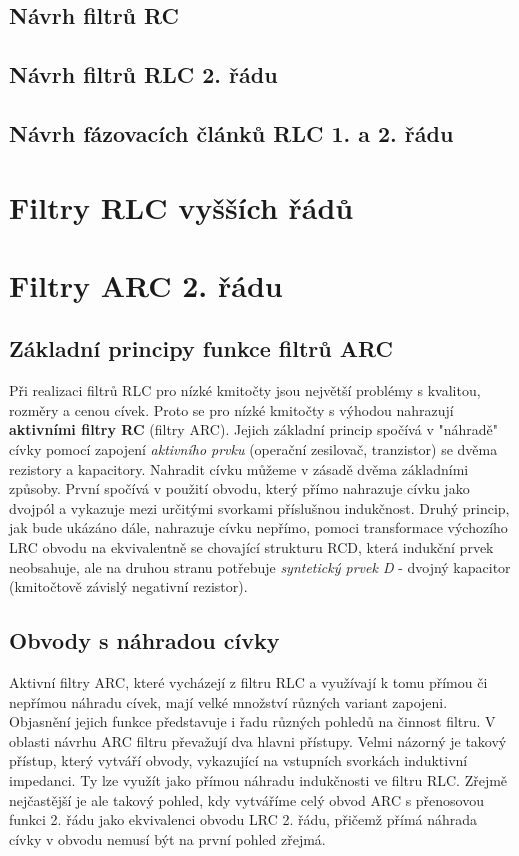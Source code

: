     \subsection{Návrh filtrů RC}
    \subsection{Návrh filtrů RLC 2. řádu}
    \subsection{Návrh fázovacích článků RLC 1. a 2. řádu}     
  \section{Filtry RLC vyšších řádů}
    
  \section{Filtry ARC 2. řádu}
    \subsection{Základní principy funkce filtrů ARC}
      Při realizaci filtrů RLC pro nízké kmitočty jsou největší problémy s kvalitou, rozměry a
      cenou cívek. Proto se pro nízké kmitočty s výhodou nahrazují \textbf{aktivními filtry RC}
      (filtry ARC). Jejich základní princip spočívá v "náhradě" cívky pomocí zapojení
      \emph{aktivního prvku} (operační zesilovač, tranzistor) se dvěma rezistory a kapacitory.
      Nahradit cívku můžeme v zásadě dvěma základními způsoby. První spočívá v použití obvodu,
      který přímo nahrazuje cívku jako dvojpól a vykazuje mezi určitými svorkami příslušnou
      indukčnost. Druhý princip, jak bude ukázáno dále, nahrazuje cívku nepřímo, pomoci
      transformace výchozího LRC obvodu na ekvivalentně se chovající strukturu RCD, která indukční
      prvek neobsahuje, ale na druhou stranu potřebuje \emph{syntetický prvek D} - dvojný kapacitor
      (kmitočtově závislý negativní rezistor).

    \subsection{Obvody s náhradou cívky}
      Aktivní filtry ARC, které vycházejí z filtru RLC a využívají k tomu přímou či nepřímou
      náhradu cívek, mají velké množství různých variant zapojeni. Objasnění jejich funkce
      představuje i řadu různých pohledů na činnost filtru. V oblasti návrhu ARC filtru převažují
      dva hlavni přístupy. Velmi názorný je takový přístup, který vytváří obvody, vykazující na
      vstupních svorkách induktivní impedanci. Ty lze využít jako přímou náhradu indukčnosti ve
      filtru RLC. Zřejmě nejčastější je ale takový pohled, kdy vytváříme celý obvod ARC s
      přenosovou funkci 2. řádu jako ekvivalenci obvodu LRC 2. řádu, přičemž přímá náhrada cívky v
      obvodu nemusí být na první pohled zřejmá.

